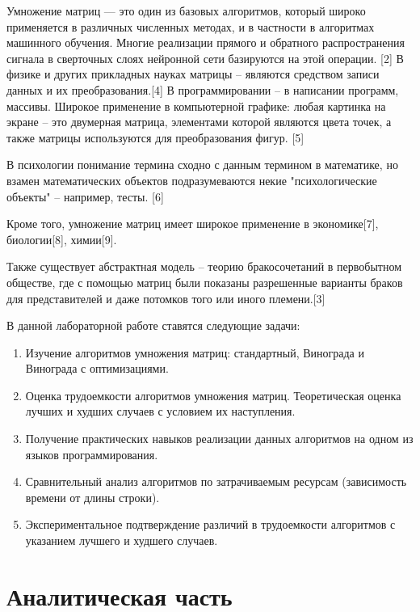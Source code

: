 \documentclass[a4paper,14pt]{article} %
\begin{document}
	Умножение матриц — это один из базовых алгоритмов, который широко применяется в различных численных методах, и в частности в алгоритмах машинного обучения. Многие реализации прямого и обратного распространения сигнала в сверточных слоях нейронной сети базируются на этой операции. [2] В физике и других прикладных науках матрицы – являются средством записи данных и их преобразования.[4] В программировании – в написании программ, массивы. Широкое применение в компьютерной графике: любая картинка на экране – это двумерная матрица, элементами которой являются цвета точек, а также матрицы используются для преобразования фигур. [5]
	
	В психологии понимание термина сходно с данным термином в математике, но взамен математических объектов подразумеваются некие "психологические объекты" – например, тесты. [6]
	
	Кроме того, умножение матриц имеет широкое применение в экономике[7], биологии[8], химии[9]. 
	
	Также существует абстрактная модель – теорию бракосочетаний в первобытном обществе, где с помощью матриц были показаны разрешенные варианты браков для представителей и даже потомков того или иного племени.[3]
	
	\hfill
	
	В данной лабораторной работе ставятся следующие задачи:
        \begin{enumerate} 
		\item Изучение алгоритмов умножения матриц: стандартный, Винограда и Винограда с оптимизациями. 
		\item Оценка трудоемкости алгоритмов умножения матриц. Теоретическая оценка лучших и худших случаев с условием их наступления. 
		\item Получение практических навыков реализации данных алгоритмов на одном из языков программирования. 
		\item Сравнительный анализ алгоритмов по затрачиваемым ресурсам (зависимость времени от длины строки). 
		\item Экспериментальное подтверждение различий в трудоемкости алгоритмов с указанием лучшего и худшего случаев. 
	\end{enumerate}
	
	\newpage


        \section{Аналитическая часть}
        \hfill
        
\end{document}
